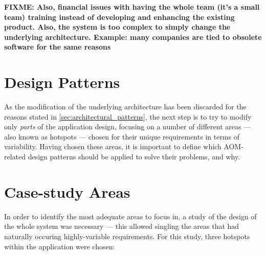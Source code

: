 \textbf{FIXME: Also, financial issues with having the whole team (it's a small team) training instead of developing and enhancing the existing product. Also, the system is too complex to simply change the underlying architecture. Example: many companies are tied to obsolete software for the same reasons}

\section{Design Patterns}\label{sec:design_patterns}

As the modification of the underlying architecture has been discarded for the reasons stated in \ref{sec:architectural_patterns}, the next step is to try to modify only \emph{parts} of the application design, focusing on a number of different areas --- also known as hotspots --- chosen for their unique requirements in terms of variability. Having chosen these areas, it is important to define which AOM-related design patterns should be applied to solve their problems, and why.

\section{Case-study Areas}\label{sec:case-study_areas}

In order to identify the most adequate areas to focus in, a study of the design of the whole system was necessary --- this allowed singling the areas that had naturally occuring highly-variable requirements. For this study, three hotspots within the application were chosen:

